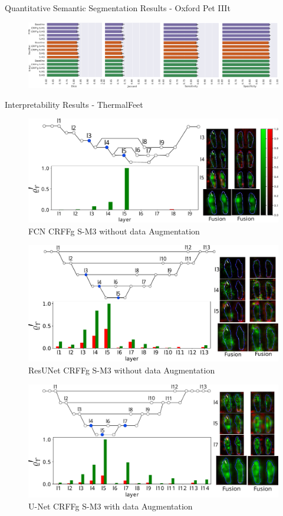 \documentclass[aspectratio=169]{beamer}
\begin{document}
\begin{frame}{Quantitative Semantic Segmentation Results - Oxford Pet IIIt}
\begin{figure}
        \centering \includegraphics[width=1\linewidth]{Figures/results_oxford.pdf}
\end{figure}
\end{frame}





\begin{frame}[allowframebreaks]{Interpretability Results - ThermalFeet}

\begin{figure}
    \centering
    \includegraphics[width=0.85\linewidth]{Figures/fcn_best.pdf}
    \caption{FCN CRFFg S-M3 without data Augmentation}
\end{figure}
\framebreak

\begin{figure}
    \centering
    \includegraphics[width=0.79\linewidth]{Figures/resunet_best.pdf}
    \caption{ResUNet CRFFg S-M3 without data Augmentation}
\end{figure}
\framebreak

\begin{figure}
    \centering
    \includegraphics[width=0.79\linewidth]{Figures/unet_best.pdf}
    \caption{U-Net CRFFg S-M3 with data Augmentation}
\end{figure}


\end{frame}
\end{document}
